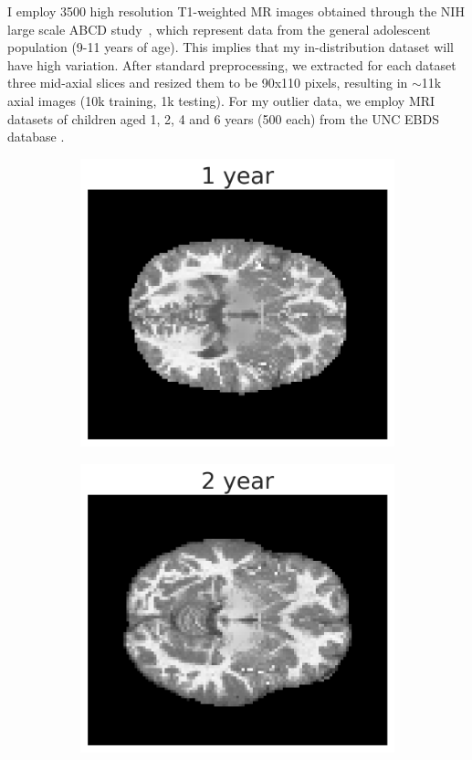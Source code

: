 I employ 3500 high resolution T1-weighted MR images obtained through the NIH large scale ABCD study~\cite{Casey2018adolescent}, which represent data from the general adolescent population (9-11 years of age). This implies that my in-distribution dataset will have high variation. After standard preprocessing, we extracted for each dataset three mid-axial slices and resized them to be 90x110 pixels, resulting in $\sim$11k axial images (10k  training, 1k testing). For my outlier data, we employ MRI datasets of children aged 1, 2, 4 and 6 years (500 each) from the UNC EBDS database \cite{Stephens:2020bo,Gilmore:2020ct}.
\begin{figure}[tbhp]
\centering
\begin{subfigure}[b]{0.22\textwidth}
    \includegraphics[width=\textwidth]{figures/1_year.png}
    \label{fig:brain_1}
\end{subfigure}
\begin{subfigure}[b]{0.22\textwidth}
    \includegraphics[width=\textwidth]{figures/2_year.png}

\end{subfigure}
\end{figure}
